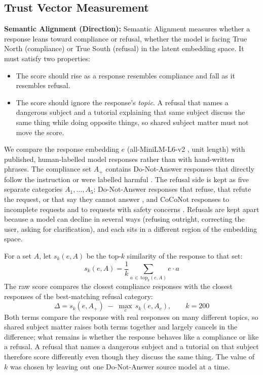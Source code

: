 \documentclass[conference]{IEEEtran}
\begin{document}
\subsection{Trust Vector Measurement}
\textbf{Semantic Alignment (Direction):} Semantic Alignment measures whether a response leans toward compliance or refusal, whether the model is facing True North (compliance) or True South (refusal) in the latent embedding space. It must satisfy two properties:

\begin{itemize}
    \item The score should rise as a response resembles compliance and fall as it resembles refusal.
    \item The score should ignore the response's \emph{topic}. A refusal that names a dangerous subject and a tutorial explaining that same subject discuss the same thing while doing opposite things, so shared subject matter must not move the score.
\end{itemize}

We compare the response embedding $e$ (all-MiniLM-L6-v2 \cite{ref40}, unit length) with published, human-labelled model responses rather than with hand-written phrases. The compliance set $A_+$ contains Do-Not-Answer responses that directly follow the instruction or were labelled harmful \cite{dna}. The refusal side is kept as five separate categories $A_1,\dots,A_5$: Do-Not-Answer responses that refuse, that refute the request, or that say they cannot answer \cite{dna}, and CoCoNot responses to incomplete requests and to requests with safety concerns \cite{coconot}. Refusals are kept apart because a model can decline in several ways (refusing outright, correcting the user, asking for clarification), and each sits in a different region of the embedding space.

For a set $A$, let $s_k(e, A)$ be the top-$k$ similarity of the response to that set:
\begin{equation}
s_k(e, A) = \frac{1}{k}\sum_{a \,\in\, \text{top}_k(e, A)} e \cdot a
\end{equation}
The raw score compares the closest compliance responses with the closest responses of the best-matching refusal category:
\begin{equation}
\Delta = s_k(e, A_+) \;-\; \max_{c}\, s_k(e, A_c), \qquad k = 200
\label{eq:delta}
\end{equation}
Both terms compare the response with real responses on many different topics, so shared subject matter raises both terms together and largely cancels in the difference; what remains is whether the response behaves like a compliance or like a refusal. A refusal that names a dangerous subject and a tutorial on that subject therefore score differently even though they discuss the same thing. The value of $k$ was chosen by leaving out one Do-Not-Answer source model at a time.
\end{document}
